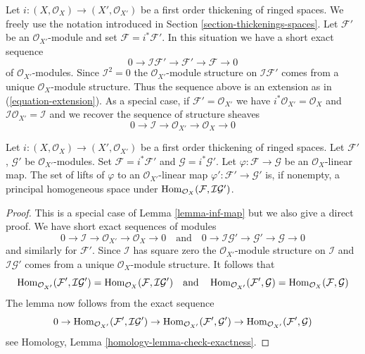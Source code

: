 \noindent
Let $i : (X, \mathcal{O}_X) \to (X', \mathcal{O}_{X'})$ be a first
order thickening of ringed spaces. We freely use the notation introduced in
Section \ref{section-thickenings-spaces}.
Let $\mathcal{F}'$ be an $\mathcal{O}_{X'}$-module
and set $\mathcal{F} = i^*\mathcal{F}'$.
In this situation we have a short exact sequence
$$
0 \to \mathcal{I}\mathcal{F}' \to \mathcal{F}' \to \mathcal{F} \to 0
$$
of $\mathcal{O}_{X'}$-modules. Since $\mathcal{I}^2 = 0$ the
$\mathcal{O}_{X'}$-module structure on $\mathcal{I}\mathcal{F}'$
comes from a unique $\mathcal{O}_X$-module structure.
Thus the sequence above is an extension as in (\ref{equation-extension}).
As a special case, if $\mathcal{F}' = \mathcal{O}_{X'}$ we have
$i^*\mathcal{O}_{X'} = \mathcal{O}_X$ and
$\mathcal{I}\mathcal{O}_{X'} = \mathcal{I}$ and we recover the
sequence of structure sheaves
$$
0 \to \mathcal{I} \to \mathcal{O}_{X'} \to \mathcal{O}_X \to 0
$$

\begin{lemma}
\label{lemma-inf-map-special}
Let $i : (X, \mathcal{O}_X) \to (X', \mathcal{O}_{X'})$
be a first order thickening of ringed spaces.
Let $\mathcal{F}'$, $\mathcal{G}'$ be $\mathcal{O}_{X'}$-modules.
Set $\mathcal{F} = i^*\mathcal{F}'$ and $\mathcal{G} = i^*\mathcal{G}'$.
Let $\varphi : \mathcal{F} \to \mathcal{G}$ be an $\mathcal{O}_X$-linear map.
The set of lifts of $\varphi$ to an $\mathcal{O}_{X'}$-linear map
$\varphi' : \mathcal{F}' \to \mathcal{G}'$ is, if nonempty, a principal
homogeneous space under
$\mathop{\mathrm{Hom}}\nolimits_{\mathcal{O}_X}(\mathcal{F}, \mathcal{I}\mathcal{G}')$.
\end{lemma}

\begin{proof}
This is a special case of Lemma \ref{lemma-inf-map} but we also
give a direct proof. We have short exact sequences of modules
$$
0 \to \mathcal{I} \to \mathcal{O}_{X'} \to \mathcal{O}_X \to 0
\quad\text{and}\quad
0 \to \mathcal{I}\mathcal{G}' \to \mathcal{G}' \to \mathcal{G} \to 0
$$
and similarly for $\mathcal{F}'$.
Since $\mathcal{I}$ has square zero the $\mathcal{O}_{X'}$-module
structure on $\mathcal{I}$ and $\mathcal{I}\mathcal{G}'$ comes from
a unique $\mathcal{O}_X$-module structure. It follows that
$$
\mathop{\mathrm{Hom}}\nolimits_{\mathcal{O}_{X'}}(\mathcal{F}', \mathcal{I}\mathcal{G}') =
\mathop{\mathrm{Hom}}\nolimits_{\mathcal{O}_X}(\mathcal{F}, \mathcal{I}\mathcal{G}')
\quad\text{and}\quad
\mathop{\mathrm{Hom}}\nolimits_{\mathcal{O}_{X'}}(\mathcal{F}', \mathcal{G}) =
\mathop{\mathrm{Hom}}\nolimits_{\mathcal{O}_X}(\mathcal{F}, \mathcal{G})
$$
The lemma now follows from the exact sequence
$$
0 \to \mathop{\mathrm{Hom}}\nolimits_{\mathcal{O}_{X'}}(\mathcal{F}', \mathcal{I}\mathcal{G}') \to
\mathop{\mathrm{Hom}}\nolimits_{\mathcal{O}_{X'}}(\mathcal{F}', \mathcal{G}') \to
\mathop{\mathrm{Hom}}\nolimits_{\mathcal{O}_{X'}}(\mathcal{F}', \mathcal{G})
$$
see Homology, Lemma \ref{homology-lemma-check-exactness}.
\end{proof}

